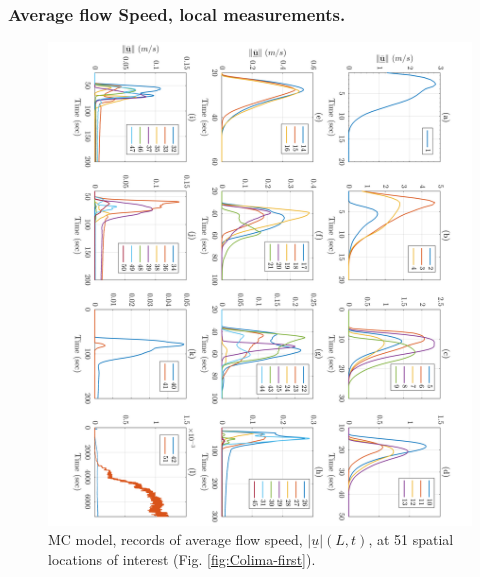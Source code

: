 \documentclass{article}
\begin{document}
\subsubsection{Average flow Speed, local measurements.}
\begin{figure}[H]
         \centering
        \includegraphics[width=1\textwidth]{MC&VS_51/Velocity_MC.png}
        \caption{MC model, records of average flow speed, $\vert\underline{u}\vert(L,t)$, at 51 spatial locations of interest (Fig. \ref{fig:Colima-first}).}
        \label{fig:BAF-V-MC}
\end{figure}
\end{document}
